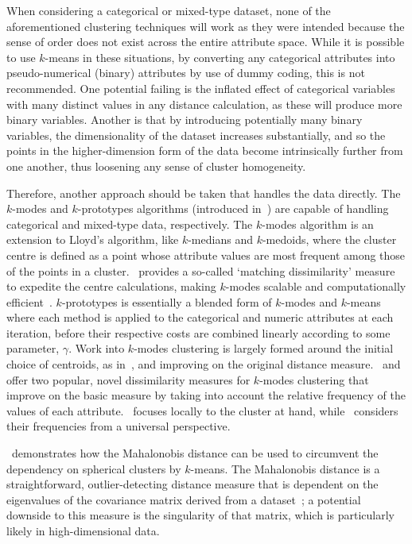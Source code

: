 When considering a categorical or mixed-type dataset, none of the aforementioned
clustering techniques will work as they were intended because the sense of order
does not exist across the entire attribute space. While it is possible to use
\(k\)-means in these situations, by converting any categorical attributes into
pseudo-numerical (binary) attributes by use of dummy coding, this is not
recommended. One potential failing is the inflated effect of categorical
variables with many distinct values in any distance calculation, as these will
produce more binary variables. Another is that by introducing potentially many
binary variables, the dimensionality of the dataset increases substantially, and
so the points in the higher-dimension form of the data become intrinsically
further from one another, thus loosening any sense of cluster homogeneity.

Therefore, another approach should be taken that handles the data directly. The
\(k\)-modes and \(k\)-prototypes algorithms (introduced in~\cite{Huang1998}) are
capable of handling categorical and mixed-type data, respectively. The
\(k\)-modes algorithm is an extension to Lloyd's algorithm, like \(k\)-medians
and \(k\)-medoids, where the cluster centre is defined as a point whose
attribute values are most frequent among those of the points in a
cluster.~\cite{Huang1998} provides a so-called `matching dissimilarity' measure
to expedite the centre calculations, making \(k\)-modes scalable and
computationally efficient~\cite{Madhuri2014}. \(k\)-prototypes is essentially a
blended form of \(k\)-modes and \(k\)-means where each method is applied to the
categorical and numeric attributes at each iteration, before their respective
costs are combined linearly according to some parameter, \(\gamma\). Work into
\(k\)-modes clustering is largely formed around the initial choice of centroids,
as in~\cite{Cao2009,Jiang2016,Khan2013,Khan2007,Taoying2013}, and improving on
the original distance measure.~\cite{Cao2012} and~\cite{Ng2007} offer two
popular, novel dissimilarity measures for \(k\)-modes clustering that improve on
the basic measure by taking into account the relative frequency of the values of
each attribute.~\cite{Ng2007} focuses locally to the cluster at hand,
while~\cite{Cao2012} considers their frequencies from a universal perspective.

\cite{Sung1998}~demonstrates how the Mahalonobis distance can be used to
circumvent the dependency on spherical clusters by \(k\)-means. The Mahalonobis
distance is a straightforward, outlier-detecting distance measure that is
dependent on the eigenvalues of the covariance matrix derived from a
dataset~\cite{Mahalonobis1936}; a potential downside to this measure is the
singularity of that matrix, which is particularly likely in high-dimensional
data.

